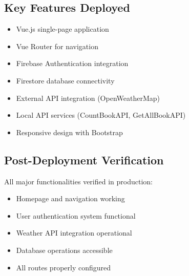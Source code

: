 \documentclass[12pt,a4paper]{article}
\begin{document}
\subsection{Key Features Deployed}

\begin{itemize}
\item Vue.js single-page application
\item Vue Router for navigation
\item Firebase Authentication integration
\item Firestore database connectivity
\item External API integration (OpenWeatherMap)
\item Local API services (CountBookAPI, GetAllBookAPI)
\item Responsive design with Bootstrap
\end{itemize}

\subsection{Post-Deployment Verification}

All major functionalities verified in production:
\begin{itemize}
\item Homepage and navigation working
\item User authentication system functional
\item Weather API integration operational
\item Database operations accessible
\item All routes properly configured
\end{itemize}

\newpage
\end{document}
